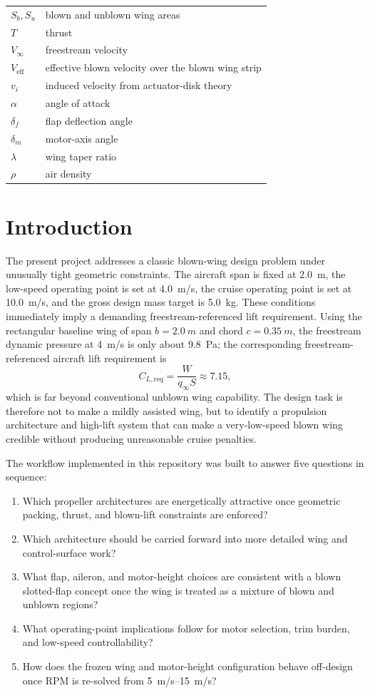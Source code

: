 \documentclass[conf]{new-aiaa}
\begin{document}
\begin{longtable*}{@{}ll@{}}
\(S_b, S_u\) & blown and unblown wing areas \\
\(T\) & thrust \\
\(V_\infty\) & freestream velocity \\
\(V_{\mathrm{eff}}\) & effective blown velocity over the blown wing strip \\
\(v_i\) & induced velocity from actuator-disk theory \\
\(\alpha\) & angle of attack \\
\(\delta_f\) & flap deflection angle \\
\(\delta_m\) & motor-axis angle \\
\(\lambda\) & wing taper ratio \\
\(\rho\) & air density \\
\end{longtable*}

\section{Introduction}

The present project addresses a classic blown-wing design problem under unusually tight geometric constraints. The aircraft span is fixed at \SI{2.0}{m}, the low-speed operating point is set at \SI{4.0}{m/s}, the cruise operating point is set at \SI{10.0}{m/s}, and the gross design mass target is \SI{5.0}{kg}. These conditions immediately imply a demanding freestream-referenced lift requirement. Using the rectangular baseline wing of span \(b=\SI{2.0}{m}\) and chord \(c=\SI{0.35}{m}\), the freestream dynamic pressure at \SI{4}{m/s} is only about \SI{9.8}{Pa}; the corresponding freestream-referenced aircraft lift requirement is
\begin{equation}
C_{L,\mathrm{req}} = \frac{W}{q_\infty S} \approx 7.15,
\end{equation}
which is far beyond conventional unblown wing capability. The design task is therefore not to make a mildly assisted wing, but to identify a propulsion architecture and high-lift system that can make a very-low-speed blown wing credible without producing unreasonable cruise penalties.

The workflow implemented in this repository was built to answer five questions in sequence:
\begin{enumerate}
\item Which propeller architectures are energetically attractive once geometric packing, thrust, and blown-lift constraints are enforced?
\item Which architecture should be carried forward into more detailed wing and control-surface work?
\item What flap, aileron, and motor-height choices are consistent with a blown slotted-flap concept once the wing is treated as a mixture of blown and unblown regions?
\item What operating-point implications follow for motor selection, trim burden, and low-speed controllability?
\item How does the frozen wing and motor-height configuration behave off-design once RPM is re-solved from \SIrange{5}{15}{m/s}?
\end{enumerate}
\end{document}
